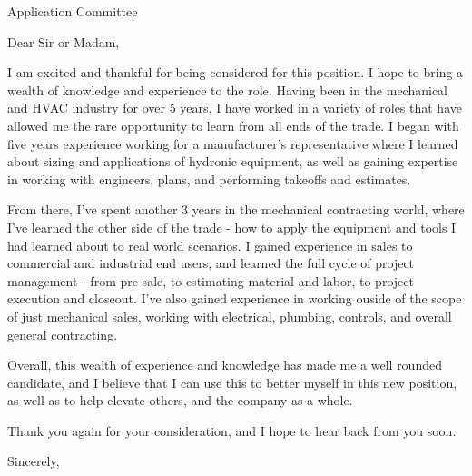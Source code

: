 \documentclass[margin]{letter}
\begin{document}
\begin{letter}{Application Committee}
    \opening{Dear Sir or Madam,}
    I am excited and thankful for being considered for this position. I hope to bring a wealth of knowledge and experience to the role.
    Having been in the mechanical and HVAC industry for over 5 years, I have worked in a variety of roles that have allowed me the rare opportunity
    to learn from all ends of the trade. I began with five years experience working for a manufacturer's representative where I learned about sizing and applications of
    hydronic equipment, as well as gaining expertise in working with engineers, plans, and performing takeoffs and estimates. 
    
    From there, I've spent another 3 years in the mechanical contracting world, where I've learned the other side of the trade - how to apply the equipment and tools I had learned about to real world scenarios.
    I gained experience in sales to commercial and industrial end users, and learned the full cycle of project management - from pre-sale, to estimating material and labor, to project execution and closeout. I've also gained experience in working
    ouside of the scope of just mechanical sales, working with electrical, plumbing, controls, and overall general contracting.

    Overall, this wealth of experience and knowledge has made me a well rounded candidate, and I believe that I can use this to better myself in this new position, as well as to help elevate others, and the company as a whole.

    Thank you again for your consideration, and I hope to hear back from you soon.
    \closing{Sincerely,}
\end{letter}
\end{document}
